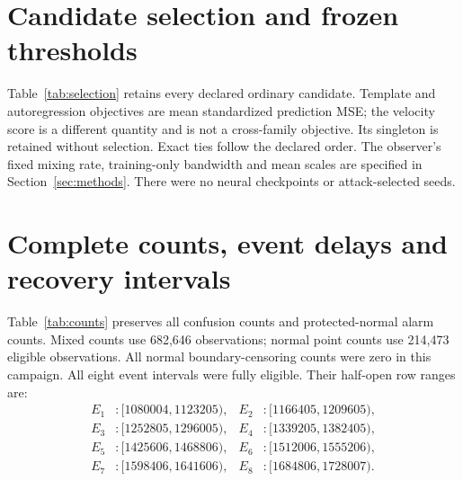 \section{Candidate selection and frozen thresholds}
\label{app:selection}
Table~\ref{tab:selection} retains every declared ordinary candidate. Template and autoregression objectives are mean standardized prediction MSE; the velocity score is a different quantity and is not a cross-family objective. Its singleton is retained without selection. Exact ties follow the declared order. The observer's fixed mixing rate, training-only bandwidth and mean scales are specified in Section~\ref{sec:methods}. There were no neural checkpoints or attack-selected seeds.
\begin{table}[htbp]\centering\small
\caption{All normal-development candidate outcomes; differently defined family scores must not be ranked together.}\label{tab:selection}

\end{table}
\begin{table}[htbp]\centering\small
\caption{Thresholds fixed by the same rank rule. Digits reflect stored binary64 values, not physical measurement precision.}\label{tab:thresholds}

\end{table}

\section{Complete counts, event delays and recovery intervals}
\label{app:events}
Table~\ref{tab:counts} preserves all confusion counts and protected-normal alarm counts. Mixed counts use 682,646 observations; normal point counts use 214,473 eligible observations. All normal boundary-censoring counts were zero in this campaign. All eight event intervals were fully eligible. Their half-open row ranges are:
\begin{align*}
 E_1 &: [1080004,1123205), & E_2 &: [1166405,1209605),\\
 E_3 &: [1252805,1296005), & E_4 &: [1339205,1382405),\\
 E_5 &: [1425606,1468806), & E_6 &: [1512006,1555206),\\
 E_7 &: [1598406,1641606), & E_8 &: [1684806,1728007).
\end{align*}

\begin{table}[htbp]\centering\small
\caption{Mixed confusion counts and separate protected-normal burden.}\label{tab:counts}
\resizebox{\textwidth}{!}{}
\end{table}
\begin{table}[htbp]\centering\scriptsize
\caption{All schedule-relative delays in seconds. Each observed overlap was also a fresh onset here; MISS remains undefined, not zero. Native-time values are rounded only for presentation.}\label{tab:delays}
\resizebox{\textwidth}{!}{}
\end{table}

